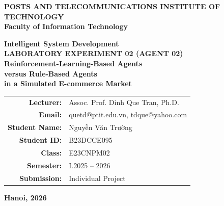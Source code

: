 \documentclass[11pt, a4paper]{article}
\begin{document}
\begin{titlepage}
\begin{center}

\vspace*{0.5cm}

\Large
\textbf{POSTS AND TELECOMMUNICATIONS INSTITUTE OF TECHNOLOGY}\\
\textbf{Faculty of Information Technology}

\vspace{2.0cm}

\Huge
\textbf{Intelligent System Development}\\
\vspace{0.4cm}
\LARGE
\textbf{LABORATORY EXPERIMENT 02 (AGENT 02)}\\
\vspace{0.6cm}
\Large
\textbf{Reinforcement-Learning-Based Agents\\versus Rule-Based Agents\\in a Simulated E-commerce Market}

\vspace{1.2cm}

\vfill

\normalsize
\begin{tabular}{rl}
\textbf{Lecturer:} & Assoc. Prof. Dinh Que Tran, Ph.D. \\
\textbf{Email:} & quetd@ptit.edu.vn, tdque@yahoo.com \\[0.8cm]
\textbf{Student Name:} & Nguyễn Văn Trường \\
\textbf{Student ID:} & B23DCCE095 \\
\textbf{Class:} & E23CNPM02 \\
\textbf{Semester:} & I.2025 -- 2026 \\
\textbf{Submission:} & Individual Project \\
\end{tabular}

\vfill

\textbf{Hanoi, 2026}

\vspace{0.5cm}

\end{center}
\end{titlepage}

{\small\tableofcontents}
\newpage

\end{document}
